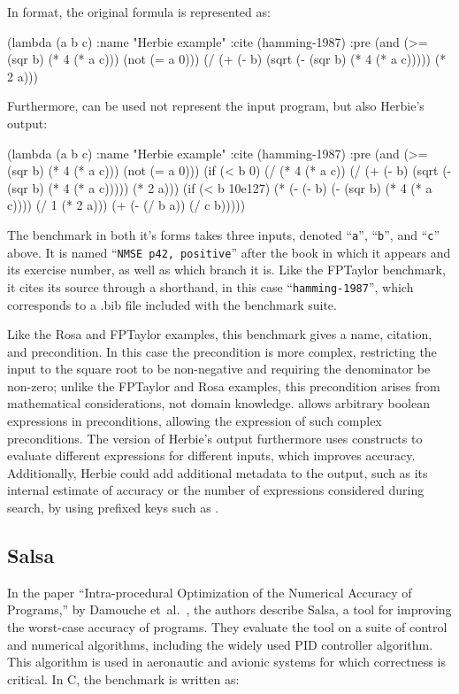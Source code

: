 \documentclass[main.tex]{subfiles}
\begin{document}
In \core format, the original formula is represented as:

\begin{code}
(lambda (a b c)
  :name "Herbie example"
  :cite (hamming-1987)
  :pre (and (>= (sqr b) (* 4 (* a c))) (not (= a 0)))
  (/ (+ (- b) (sqrt (- (sqr b) (* 4 (* a c))))) (* 2 a)))
\end{code}

Furthermore, \core can be used not represent the input program,
  but also Herbie's output:

\begin{code}
(lambda (a b c)
  :name "Herbie example"
  :cite (hamming-1987)
  :pre (and (>= (sqr b) (* 4 (* a c))) (not (= a 0)))
  (if (< b 0)
      (/ (* 4 (* a c))
         (/ (+ (- b) (sqrt (- (sqr b) (* 4 (* a c))))) (* 2 a)))
      (if (< b 10e127)
          (* (- (- b) (- (sqr b) (* 4 (* a c)))) (/ 1 (* 2 a)))
          (+ (- (/ b a)) (/ c b)))))
\end{code}

The benchmark in both it's forms takes three inputs, denoted
``\verb|a|'', ``\verb|b|'', and ``\verb|c|'' above. It is named
``\verb|NMSE p42, positive|'' after the book in which it appears and
its exercise number, as well as which branch it is. Like the FPTaylor
benchmark, it cites its source through a shorthand, in this case
``\verb|hamming-1987|'', which corresponds to a .bib file included
with the benchmark suite.

Like the Rosa and FPTaylor examples,
  this benchmark gives a name, citation, and precondition.
In this case the precondition is more complex,
  restricting the input to the square root to be non-negative
  and requiring the denominator be non-zero;
  unlike the FPTaylor and Rosa examples,
  this precondition arises from mathematical considerations,
  not domain knowledge.
\core allows arbitrary boolean expressions in preconditions,
  allowing the expression of such complex preconditions.
The \core version of Herbie's output
  furthermore uses  constructs to evaluate
  different expressions for different inputs,
  which improves accuracy.
Additionally, Herbie could add additional metadata to the output,
  such as its internal estimate of accuracy
  or the number of expressions considered during search,
  by using prefixed keys such as .

\subsection{Salsa}
In the paper ``Intra-procedural Optimization of the Numerical Accuracy
of Programs,'' by Damouche et~al.~\cite{fmics15}, the authors describe
Salsa, a tool for improving the worst-case accuracy of programs.
They evaluate the tool on a suite of control and numerical algorithms,
  including the widely used PID controller algorithm. This algorithm is used in
aeronautic and avionic systems for which correctness is critical. In
C, the benchmark is written as:
\end{document}
